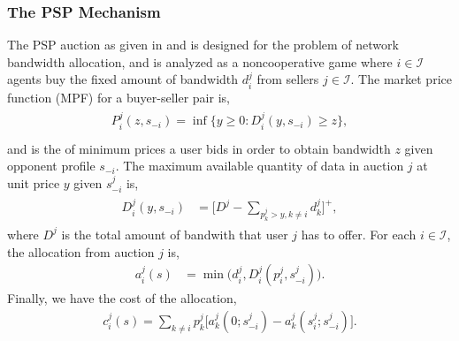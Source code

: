 \documentclass[sigconf, anonymous]{acmart}
\newcommand{\mcI}{\mathcal{I}}
\theoremstyle{definition}
\begin{document}
\subsubsection{The PSP Mechanism}\label{mechanism}
The PSP auction as given in \cite{lazar} and \cite{semret} is designed for the
problem of network bandwidth allocation, and is analyzed as a noncooperative
game where $i\in\mcI$ agents buy the
fixed amount of bandwidth $d_i^j$ from sellers $j\in\mcI$.
The market price function (MPF) for a buyer-seller pair is,
\begin{align}\label{dataprice}
\begin{split}
    P_i^j(z, s_{-i})= \inf\bigg\lbrace y\ge 0 : D_i^j(y, s_{-i}) \ge z \bigg\rbrace,\\
\end{split}
\end{align}
and is the of minimum prices a user bids in
order to obtain bandwidth $z$ given opponent profile $s_{-i}$. 
The maximum available quantity of data in auction
$j$ at unit price $y$ given $s_{-i}^j$ is,
\begin{align}\label{datapriceinverse}
\begin{split}
    D_i^j(y, s_{-i}) &= \bigg[ D^j - \sum_{p_k^j>y,k\ne i} d_k^j  \bigg]^+,
\end{split}
\end{align}
where $D^j$ is the total amount of bandwith that user $j$ has to offer.
For each $i \in \mcI$, the allocation from auction $j$ is,
\begin{align}\label{dataallocation}
    a_i^j(s) &= \min\bigg( d_i^j, 
    D_i^j(p_i^j,s_{-i}^j)\bigg).
\end{align}
Finally, we have the cost of the allocation,
\begin{align}\label{datacost}
    c_i^j(s) = \displaystyle\sum_{k\ne i} 
p_k^j \big[a_k^j(0; s_{-i}^j)
    -a_k^j(s_i^j;s_{-i}^j)\big].
\end{align}
\end{document}
